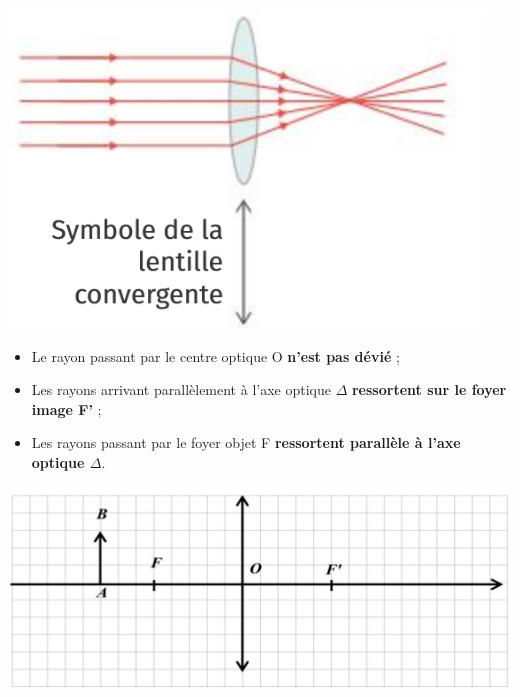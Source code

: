 \begin{tcolorbox}[colback=green!5!white,colframe=green!75!black,title=\textbf{Lentille convergente :}]
\begin{multicols}{2}
    \includegraphics[scale=0.7]{Images/Lentille.PNG}
    
\end{multicols}
\end{tcolorbox}

\begin{tcolorbox}[colback=red!5!white,colframe=red!75!black,title=\textbf{Construction d'une image par une lentille :}]
\begin{itemize}
    \item Le rayon passant par le centre optique O \textbf{n'est pas dévié} ;
    \item Les rayons arrivant parallèlement à l'axe optique $\Delta$ \textbf{ressortent sur le foyer image F'} ;
    \item Les rayons passant par le foyer objet F \textbf{ressortent parallèle à l'axe optique $\Delta$}.
\end{itemize}
\end{tcolorbox}

\begin{center}
    \includegraphics[scale=1]{Images/Lentille_construction_eleve.PNG}
\end{center}

